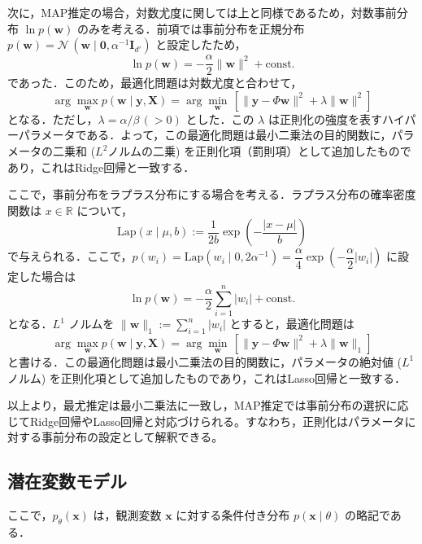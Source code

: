 \documentclass[titlepage]{ltjsbook}
\begin{document}
次に，MAP推定の場合，対数尤度に関しては上と同様であるため，対数事前分布 $\ln p(\mathbf{w})$ のみを考える．前項では事前分布を正規分布 $p(\mathbf{w})=\mathcal{N}\,\left(\mathbf{w}\mid \mathbf{0},\alpha^{-1} \mathbf{I}_{d'}\right)$ と設定したため，
\begin{equation}
\ln p(\mathbf{w}) = -\frac{\alpha}{2}\lVert \mathbf{w}\rVert^2 + \text{const.}
\end{equation}
であった．このため，最適化問題は対数尤度と合わせて，
\begin{equation}
\arg\max_{\mathbf{w}} p(\mathbf{w} \mid \mathbf{y}, \mathbf{X}) =\arg\min_{\mathbf{w}}\, \left[\lVert \mathbf{y}-\Phi\mathbf{w}\rVert^2 + \lambda \lVert \mathbf{w}\rVert^2 \right]
\end{equation}
となる．ただし，$\lambda = \alpha / \beta\, (>0)$ とした．この $\lambda$ は正則化の強度を表すハイパーパラメータである．よって，この最適化問題は最小二乗法の目的関数に，パラメータの二乗和 ($L^2$ノルムの二乗) を正則化項（罰則項）として追加したものであり，これはRidge回帰と一致する．

ここで，事前分布をラプラス分布にする場合を考える．ラプラス分布の確率密度関数は $x\in \mathbb{R}$ について，
\begin{equation}
\textrm{Lap}(x\mid \mu, b):=\dfrac{1}{2b}\exp\left(-\dfrac{\lvert x-\mu\rvert}{b}\right)
\end{equation}
で与えられる．ここで，$p(w_i)=\textrm{Lap}(w_i \mid 0, 2\alpha^{-1})=\dfrac{\alpha}{4}\exp\left(-\dfrac{\alpha}{2} \lvert w_i\rvert \right)$ に設定した場合は
\begin{equation}
\ln p(\mathbf{w}) = -\frac{\alpha}{2} \sum_{i=1}^n \lvert w_i\rvert+ \text{const.}
\end{equation}
となる．$L^1$ ノルムを $\lVert \mathbf{w}\rVert _1 := \sum_{i=1}^n \lvert w_i\rvert$ とすると，最適化問題は
\begin{equation}
\arg\max_{\mathbf{w}} p(\mathbf{w} \mid \mathbf{y}, \mathbf{X}) =\arg\min_{\mathbf{w}}\, \left[\lVert \mathbf{y}-\Phi\mathbf{w}\rVert^2 + \lambda\lVert \mathbf{w}\rVert _1 \right]
\end{equation}
と書ける．この最適化問題は最小二乗法の目的関数に，パラメータの絶対値 ($L^1$ノルム) を正則化項として追加したものであり，これはLasso回帰と一致する．

以上より，最尤推定は最小二乗法に一致し，MAP推定では事前分布の選択に応じてRidge回帰やLasso回帰と対応づけられる。すなわち，正則化はパラメータに対する事前分布の設定として解釈できる。

\subsection{潜在変数モデル}
ここで，$p_\theta(\mathbf{x})$ は，観測変数 $\mathbf{x}$ に対する条件付き分布 $p(\mathbf{x} \mid \theta)$ の略記である．
\end{document}
